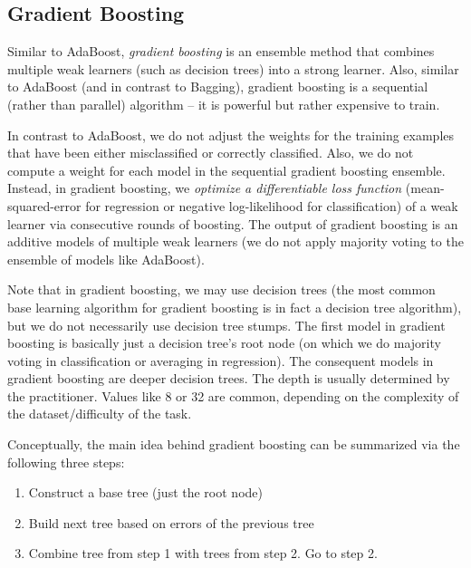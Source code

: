 \subsection{Gradient Boosting}

Similar to AdaBoost, \textit{gradient boosting} is an ensemble method that combines multiple weak learners (such as decision trees) into a strong learner. Also, similar to AdaBoost (and in contrast to Bagging), gradient boosting is a sequential (rather than parallel) algorithm – it is powerful but rather expensive to train.

In contrast to AdaBoost, we do not adjust the weights for the training examples that have been either misclassified or correctly classified. Also, we do not compute a weight for each model in the sequential gradient boosting ensemble. Instead, in gradient boosting, we \textit{optimize a differentiable loss function} (\eg mean-squared-error for regression or negative log-likelihood for classification) of a weak learner via consecutive rounds of boosting. The output of gradient boosting is an additive models of multiple weak learners (we do not apply majority voting to the ensemble of models like AdaBoost).

Note that in gradient boosting, we may use decision trees (the most common base learning algorithm for gradient boosting is in fact a decision tree algorithm), but we do not necessarily use decision tree stumps. The first model in gradient boosting is basically just a decision tree's root node (on which we do majority voting in classification or averaging in regression). The consequent models in gradient boosting are deeper decision trees. The depth is usually determined by the practitioner. Values like 8 or 32 are common, depending on the complexity of the dataset/difficulty of the task.

Conceptually, the main idea behind gradient boosting can be summarized via the following three steps:
\begin{enumerate}
	\item Construct a base tree (just the root node)
	\item Build next tree based on errors of the previous tree
	\item Combine tree from step 1 with trees from step 2. Go to step 2.
\end{enumerate}

